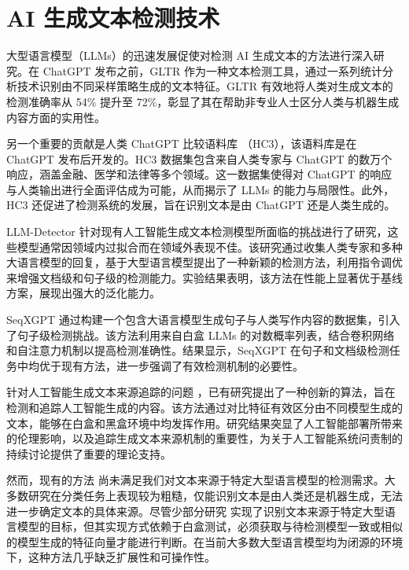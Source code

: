 \section{AI 生成文本检测技术}
\label{sec:llmdetect}

大型语言模型（LLMs）的迅速发展促使对检测 AI 生成文本的方法进行深入研究。在 ChatGPT 发布之前，GLTR \cite{gehrmann_gltr_2019} 作为一种文本检测工具，通过一系列统计分析技术识别由不同采样策略生成的文本特征。GLTR 有效地将人类对生成文本的检测准确率从 54\% 提升至 72\%，彰显了其在帮助非专业人士区分人类与机器生成内容方面的实用性。

另一个重要的贡献是人类 ChatGPT 比较语料库 \cite{guo_how_2023}（HC3），该语料库是在 ChatGPT 发布后开发的。HC3 数据集包含来自人类专家与 ChatGPT 的数万个响应，涵盖金融、医学和法律等多个领域。这一数据集使得对 ChatGPT 的响应与人类输出进行全面评估成为可能，从而揭示了 LLMs 的能力与局限性。此外，HC3 还促进了检测系统的发展，旨在识别文本是由 ChatGPT 还是人类生成的。

LLM-Detector \cite{wang_llm-detector_2024} 针对现有人工智能生成文本检测模型所面临的挑战进行了研究，这些模型通常因领域内过拟合而在领域外表现不佳。该研究通过收集人类专家和多种大语言模型的回复，基于大型语言模型提出了一种新颖的检测方法，利用指令调优来增强文档级和句子级的检测能力。实验结果表明，该方法在性能上显著优于基线方案，展现出强大的泛化能力。

SeqXGPT \cite{wang_seqxgpt_2023} 通过构建一个包含大语言模型生成句子与人类写作内容的数据集，引入了句子级检测挑战。该方法利用来自白盒 LLMs 的对数概率列表，结合卷积网络和自注意力机制以提高检测准确性。结果显示，SeqXGPT 在句子和文档级检测任务中均优于现有方法，进一步强调了有效检测机制的必要性。

针对人工智能生成文本来源追踪的问题 \cite{li_origin_2023}，已有研究提出了一种创新的算法，旨在检测和追踪人工智能生成的内容。该方法通过对比特征有效区分由不同模型生成的文本，能够在白盒和黑盒环境中均发挥作用。研究结果突显了人工智能部署所带来的伦理影响，以及追踪生成文本来源机制的重要性，为关于人工智能系统问责制的持续讨论提供了重要的理论支持。

然而，现有的方法 \cite{gehrmann_gltr_2019, guo_how_2023, wang_llm-detector_2024, wang_seqxgpt_2023} 尚未满足我们对文本来源于特定大型语言模型的检测需求。大多数研究在分类任务上表现较为粗糙，仅能识别文本是由人类还是机器生成，无法进一步确定文本的具体来源。尽管少部分研究 \cite{li_origin_2023} 实现了识别文本来源于特定大型语言模型的目标，但其实现方式依赖于白盒测试，必须获取与待检测模型一致或相似的模型生成的特征向量才能进行判断。在当前大多数大型语言模型均为闭源的环境下，这种方法几乎缺乏扩展性和可操作性。

